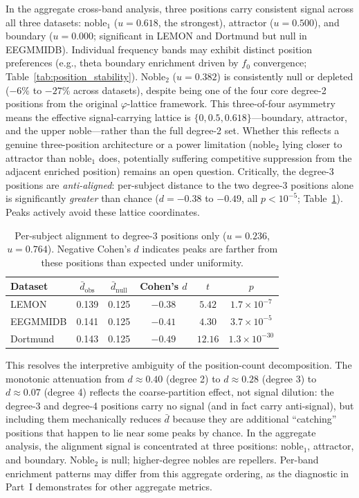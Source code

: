 \documentclass[11pt,a4paper]{article}
\newcommand{\phisym}{\varphi}
\newcommand{\fzero}{f_0}
\begin{document}
In the aggregate cross-band analysis, three positions carry consistent signal across all three datasets: noble$_1$ ($u = 0.618$, the strongest), attractor ($u = 0.500$), and boundary ($u = 0.000$; significant in LEMON and Dortmund but null in EEGMMIDB). Individual frequency bands may exhibit distinct position preferences (e.g., theta boundary enrichment driven by $\fzero$ convergence; Table~\ref{tab:position_stability}). Noble$_2$ ($u = 0.382$) is consistently null or depleted ($-6\%$ to $-27\%$ across datasets), despite being one of the four core degree-2 positions from the original $\phisym$-lattice framework. This three-of-four asymmetry means the effective signal-carrying lattice is $\{0, 0.5, 0.618\}$---boundary, attractor, and the upper noble---rather than the full degree-2 set. Whether this reflects a genuine three-position architecture or a power limitation (noble$_2$ lying closer to attractor than noble$_1$ does, potentially suffering competitive suppression from the adjacent enriched position) remains an open question. Critically, the degree-3 positions are \textit{anti-aligned}: per-subject distance to the two degree-3 positions alone is significantly \textit{greater} than chance ($d = -0.38$ to $-0.49$, all $p < 10^{-5}$; Table~\ref{tab:deg3_critical}). Peaks actively avoid these lattice coordinates.

\begin{table}[H]
\centering
\caption{Per-subject alignment to degree-3 positions only ($u = 0.236$, $u = 0.764$). Negative Cohen's $d$ indicates peaks are farther from these positions than expected under uniformity.}
\label{tab:deg3_critical}
\begin{tabular}{lccccc}
\toprule
Dataset & $\bar{d}_{\text{obs}}$ & $\bar{d}_{\text{null}}$ & Cohen's $d$ & $t$ & $p$ \\
\midrule
LEMON & 0.139 & 0.125 & $-0.38$ & $5.42$ & $1.7 \times 10^{-7}$ \\
EEGMMIDB & 0.141 & 0.125 & $-0.41$ & $4.30$ & $3.7 \times 10^{-5}$ \\
Dortmund & 0.143 & 0.125 & $-0.49$ & $12.16$ & $1.3 \times 10^{-30}$ \\
\bottomrule
\end{tabular}
\end{table}

This resolves the interpretive ambiguity of the position-count decomposition. The monotonic attenuation from $d \approx 0.40$ (degree 2) to $d \approx 0.28$ (degree 3) to $d \approx 0.07$ (degree 4) reflects the coarse-partition effect, not signal dilution: the degree-3 and degree-4 positions carry no signal (and in fact carry anti-signal), but including them mechanically reduces $\bar{d}$ because they are additional ``catching'' positions that happen to lie near some peaks by chance. In the aggregate analysis, the alignment signal is concentrated at three positions: noble$_1$, attractor, and boundary. Noble$_2$ is null; higher-degree nobles are repellers. Per-band enrichment patterns may differ from this aggregate ordering, as the diagnostic in Part~I demonstrates for other aggregate metrics.
\end{document}
